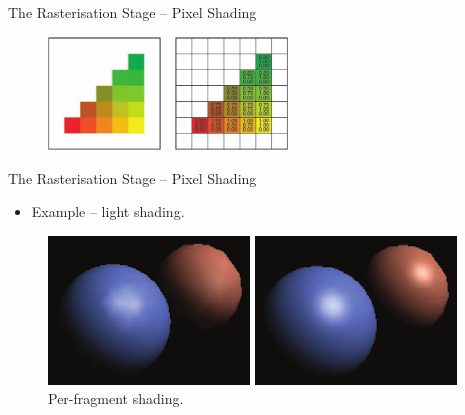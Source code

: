 \documentclass{beamer}
\begin{document}
\begin{frame}{The Rasterisation Stage -- Pixel Shading}
	\begin{figure}[t]
		\includegraphics[height=3cm]{interpolation-2}
		\centering
	\end{figure}

\end{frame}

\begin{frame}{The Rasterisation Stage -- Pixel Shading}

	\begin{itemize}
		\item Example -- light shading.
	\end{itemize}

	\vskip 1cm

	\begin{figure}
		\centering
		\begin{minipage}{.5\textwidth}
			\centering
			\includegraphics[width=.8\linewidth]{shading-1}
			\caption{Per-vertex shading.}
		\end{minipage}%
		\begin{minipage}{.5\textwidth}
			\centering
			\includegraphics[width=.8\linewidth]{shading-2}
			\caption{Per-fragment shading.}
		\end{minipage}
	\end{figure}

\end{frame}
\end{document}
